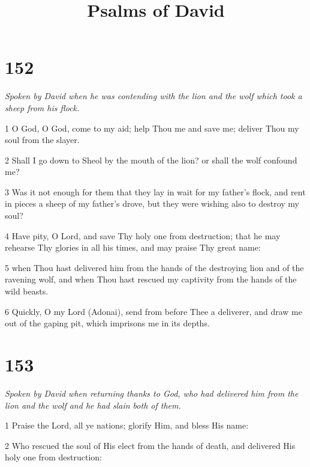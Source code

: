 

\title{Psalms of David}

\chapter{152}

\par \textit{Spoken by David when he was contending with the lion and the wolf which took a sheep from his flock.}

\par 1 O God, O God, come to my aid; help Thou me and save me; deliver Thou my soul from the slayer. 

\par 2 Shall I go down to Sheol by the mouth of the lion? or shall the wolf confound me? 

\par 3 Was it not enough for them that they lay in wait for my father's flock, and rent in pieces a sheep of my father's drove, but they were wishing also to destroy my soul? 

\par 4 Have pity, O Lord, and save Thy holy one from destruction; that he may rehearse Thy glories in all his times, and may praise Thy great name: 

\par 5 when Thou hast delivered him from the hands of the destroying lion and of the ravening wolf, and when Thou hast rescued my captivity from the hands of the wild beasts. 

\par 6 Quickly, O my Lord (Adonai), send from before Thee a deliverer, and draw me out of the gaping pit, which imprisons me in its depths.

\chapter{153}

\par \textit{Spoken by David when returning thanks to God, who had delivered him from the lion and the wolf and he had slain both of them.}

\par 1 Praise the Lord, all ye nations; glorify Him, and bless His name: 

\par 2 Who rescued the soul of His elect from the hands of death, and delivered His holy one from destruction: 

